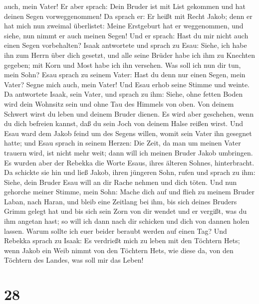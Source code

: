 auch, mein Vater!  Er aber sprach: Dein Bruder ist mit
List gekommen und hat deinen Segen vorweggenommen!  Da
sprach er: Er heißt mit Recht Jakob; denn er hat mich nun zweimal
überlistet: Meine Erstgeburt hat er weggenommen, und siehe, nun nimmt er
auch meinen Segen! Und er sprach: Hast du mir nicht auch einen Segen
vorbehalten?  Isaak antwortete und sprach zu Esau: Siehe,
ich habe ihn zum Herrn über dich gesetzt, und alle seine Brüder habe ich
ihm zu Knechten gegeben; mit Korn und Most habe ich ihn versehen. Was
soll ich nun dir tun, mein Sohn?  Esau sprach zu seinem
Vater: Hast du denn nur einen Segen, mein Vater? Segne mich auch, mein
Vater! Und Esau erhob seine Stimme und weinte.  Da
antwortete Isaak, sein Vater, und sprach zu ihm: Siehe, ohne fetten
Boden wird dein Wohnsitz sein und ohne Tau des Himmels von oben.
 Von deinem Schwert wirst du leben und deinem Bruder
dienen. Es wird aber geschehen, wenn du dich befreien kannst, daß du
sein Joch von deinem Halse reißen wirst.  Und Esau ward
dem Jakob feind um des Segens willen, womit sein Vater ihn gesegnet
hatte; und Esau sprach in seinem Herzen: Die Zeit, da man um meinen
Vater trauern wird, ist nicht mehr weit; dann will ich meinen Bruder
Jakob umbringen.  Es wurden aber der Rebekka die Worte
Esaus, ihres älteren Sohnes, hinterbracht. Da schickte sie hin und ließ
Jakob, ihren jüngeren Sohn, rufen und sprach zu ihm: Siehe, dein Bruder
Esau will an dir Rache nehmen und dich töten.  Und nun
gehorche meiner Stimme, mein Sohn: Mache dich auf und flieh zu meinem
Bruder Laban, nach Haran,  und bleib eine Zeitlang bei
ihm, bis sich deines Bruders Grimm gelegt hat  und bis
sich sein Zorn von dir wendet und er vergißt, was du ihm angetan hast;
so will ich dann nach dir schicken und dich von dannen holen lassen.
Warum sollte ich euer beider beraubt werden auf einen Tag?
 Und Rebekka sprach zu Isaak: Es verdrießt mich zu leben
mit den Töchtern Hets; wenn Jakob ein Weib nimmt von den Töchtern Hets,
wie diese da, von den Töchtern des Landes, was soll mir das Leben!

\hypertarget{section-27}{%
\section{28}\label{section-27}}

